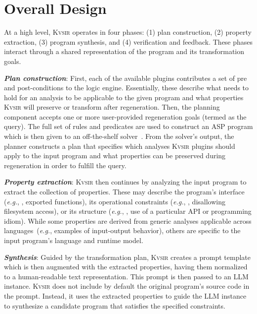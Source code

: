 \documentclass[nonacm,sigplan,review]{acmart}
\def\eg{{\em e.g.}, }
\newcommand{\sys}{{\scshape Kv{\textalpha}sir}\xspace}
\newcommand{\heading}[1]{\vspace{2pt}\noindent\textbf{\emph{#1}}:\enspace}
\begin{document}
\section{Overall Design}
\label{sec:design}

At a high level, \sys operates in four phases: (1) plan construction, (2)
property extraction, (3) program synthesis, and (4) verification and feedback.
These phases interact through a shared representation of the program and its
transformation goals.

\heading{Plan construction}
First, each of the available plugins contributes a set of pre and post-conditions 
to the logic engine.
Essentially, these describe what needs to hold for an analysis to be applicable to the given 
program and what properties \sys will preserve or transform after regeneration.
Then, the planning component accepts one or more user-provided regeneration goals (termed as the query).
The full set of rules and predicates are used to construct an ASP program
which is then given to an off-the-shelf solver~\cite{gebser2007clasp}.
From the solver's output, the planner constructs a plan that specifies which
analyses \sys plugins should apply to the input program and what properties can be
preserved during regeneration in order to fulfill the query.

\heading{Property extraction} \sys then continues by analyzing the input program to
extract the collection of properties.
These may describe the program's interface
(\eg, exported functions), its operational constraints (\eg, disallowing
filesystem access), or its structure (\eg, use of a particular API or programming idiom).
While some properties are derived from generic analyses
applicable across languages~(\eg examples of input-output behavior), others are specific to the input program's language and runtime model.

\heading{Synthesis}
Guided by the transformation plan, \sys creates a prompt template which is then
augmented with the extracted properties, having them normalized to a human-readable text representation.
This prompt is then passed to an LLM instance.
\sys does not include by default the original program's source code in the prompt.
Instead, it uses the extracted properties to guide the LLM instance 
to synthesize a candidate program that satisfies the specified constraints.
\end{document}
